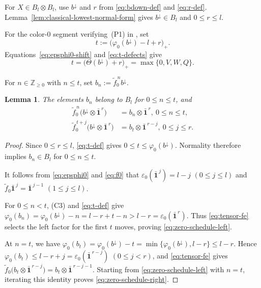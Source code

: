 \documentclass[11pt,reqno]{amsart}
\newcommand{\Zge}{\mathbb Z_{\ge 0}}
\numberwithin{table}{section}
\numberwithin{equation}{section}
\theoremstyle{plain}
\newtheorem{lemma}[theorem]{Lemma}
\theoremstyle{definition}
\begin{document}
For \(X\in B_l\otimes B_l\), use \(b^\downarrow\) and \(r\)
from \eqref{eq:bdown-def} and \eqref{eq:r-def}.
Lemma~\ref{lem:classical-lowest-normal-form} gives
\(b^\downarrow\in B_l\) and \(0\le r\le l\).

For the color-\(0\) segment verifying~\textup{(P1)} in
\cite[Section~7.1]{KMOY}, set
\begin{equation}\label{eq:t-def}
	t:=\bigl(\varphi_0(b^\downarrow)-l+r\bigr)_+.
\end{equation}
Equations~\eqref{eq:epsphi0-shift} and \eqref{eq:t-defects} give
\begin{equation}\label{eq:t-max}
	t
	=
	\bigl(\Theta(b^\downarrow)+r\bigr)_+
	=
	\max\{0,V,W,Q\}.
\end{equation}

For \(n\in\Zge\) with \(n\le t\), set
\(b_n:=\widetilde f_0^{\,n}b^\downarrow\).

\begin{lemma}
	\label{lem:KMOY-zero-schedule}
	The elements \(b_n\) belong to \(B_l\) for \(0\le n\le t\), and
	\begin{align}
		\widetilde f_0^{\,n}
		\bigl(b^\downarrow\otimes\bar{\mathbf1}^{\,r}\bigr)
		&=
		b_n\otimes\bar{\mathbf1}^{\,r},
		\  0\le n\le t,
		\label{eq:zero-schedule-left}\\
		\widetilde f_0^{\,t+j}
		\bigl(b^\downarrow\otimes\bar{\mathbf1}^{\,r}\bigr)
		&=
		b_t\otimes\bar{\mathbf1}^{\,r-j},
		\  0\le j\le r.
		\label{eq:zero-schedule-right}
	\end{align}
\end{lemma}

\begin{proof}
	Since \(0\le r\le l\), \eqref{eq:t-def} gives
	\(0\le t\le\varphi_0(b^\downarrow)\).
	Normality therefore implies \(b_n\in B_l\) for \(0\le n\le t\).
	
	It follows from \eqref{eq:epsphi0} and \eqref{eq:f0} that $	\varepsilon_0(\bar{\mathbf1}^{\,j})=l-j$ $(0\le j\le l)$ and $\widetilde f_0\bar{\mathbf1}^{\,j}=\bar{\mathbf1}^{\,j-1}$ $(1\le j\le l)$.

	For \(0\le n<t\), \textup{(C3)} and \eqref{eq:t-def} give $\varphi_0(b_n)
	=
	\varphi_0(b^\downarrow)-n
	=
	l-r+t-n
	>
	l-r
	=
	\varepsilon_0(\bar{\mathbf1}^{\,r})$.
	Thus \eqref{eq:tensor-fe} selects the left factor for the first
	\(t\) moves, proving \eqref{eq:zero-schedule-left}.
	
	At \(n=t\), we have $\varphi_0(b_t)
	=
	\varphi_0(b^\downarrow)-t
	=
	\min\{\varphi_0(b^\downarrow),l-r\}
	\le l-r$.
	Hence $\varphi_0(b_t)
	\le l-r+j
	=
	\varepsilon_0(\bar{\mathbf1}^{\,r-j})$ $(0\le j<r)$,
	and \eqref{eq:tensor-fe} gives $\widetilde f_0
	\bigl(b_t\otimes\bar{\mathbf1}^{\,r-j}\bigr)
	=
	b_t\otimes\bar{\mathbf1}^{\,r-j-1}$.
	Starting from \eqref{eq:zero-schedule-left} with \(n=t\),
	iterating this identity proves \eqref{eq:zero-schedule-right}.
\end{proof}
\end{document}
